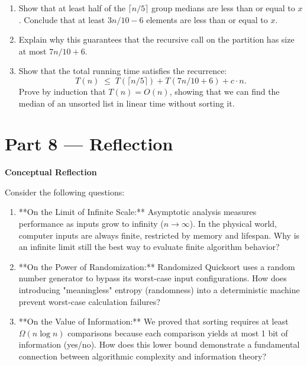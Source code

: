 \documentclass[12pt, a4paper]{book}
\begin{document}
\begin{deepbox}
\begin{enumerate}[label=\textbf{D\arabic*.}]
        \begin{enumerate}[label=(\alph*)]
          \item Show that at least half of the $\lceil n/5 \rceil$ group medians are less than or equal to $x$.
                Conclude that at least $3n/10 - 6$ elements are less than or equal to $x$.
          \item Explain why this guarantees that the recursive call on the partition has size at most $7n/10 + 6$.
          \item Show that the total running time satisfies the recurrence:
                \[
                  T(n) \;\le\; T(\lceil n/5 \rceil) + T(7n/10 + 6) + c \cdot n.
                \]
                Prove by induction that $T(n) = O(n)$, showing that we can find the median of an unsorted list in linear time without sorting it.
        \end{enumerate}
\end{enumerate}
\end{deepbox}

\newpage

\section{Part 8 --- Reflection}

\begin{reflectionbox}
\textbf{Conceptual Reflection}

Consider the following questions:
\begin{enumerate}
  \item **On the Limit of Infinite Scale:** Asymptotic analysis measures performance as inputs grow to infinity ($n \to \infty$). In the physical world, computer inputs are always finite, restricted by memory and lifespan. Why is an infinite limit still the best way to evaluate finite algorithm behavior?
  \item **On the Power of Randomization:** Randomized Quicksort uses a random number generator to bypass its worst-case input configurations. How does introducing "meaningless" entropy (randomness) into a deterministic machine prevent worst-case calculation failures?
  \item **On the Value of Information:** We proved that sorting requires at least $\Omega(n \log n)$ comparisons because each comparison yields at most 1 bit of information (yes/no). How does this lower bound demonstrate a fundamental connection between algorithmic complexity and information theory?
\end{enumerate}
\end{reflectionbox}
\end{document}
